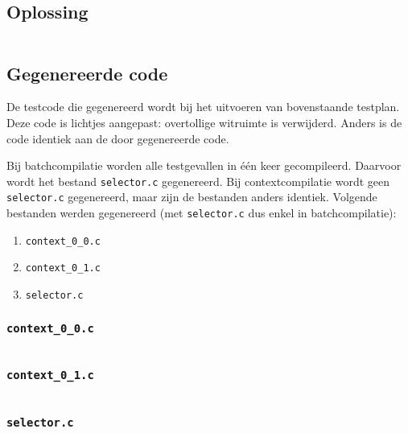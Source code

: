 \subsection{Oplossing}\label{subsec:echo-c-oplossing}

\inputminted{c}{sources/echo/correct.c}

\subsection{Gegenereerde code}\label{subsec:echo-c-gegenereerde-code}

De testcode die gegenereerd wordt bij het uitvoeren van bovenstaande testplan.
Deze code is lichtjes aangepast: overtollige witruimte is verwijderd.
Anders is de code identiek aan de door \tested{} gegenereerde code.

Bij batchcompilatie worden alle testgevallen in één keer gecompileerd.
Daarvoor wordt het bestand \texttt{selector.c} gegenereerd.
Bij contextcompilatie wordt geen \texttt{selector.c} gegenereerd, maar zijn de bestanden anders identiek.
Volgende bestanden werden gegenereerd (met \texttt{selector.c} dus enkel in batchcompilatie):

\begin{enumerate}
    \item \texttt{context\_0\_0.c}
    \item \texttt{context\_0\_1.c}
    \item \texttt{selector.c}
\end{enumerate}

\subsubsection{\texttt{context\_0\_0.c}}

\inputminted{c}{sources/echo/context_0_0.c}

\subsubsection{\texttt{context\_0\_1.c}}

\inputminted{c}{sources/echo/context_0_1.c}

\subsubsection{\texttt{selector.c}}

\inputminted{c}{sources/echo/selector.c}


